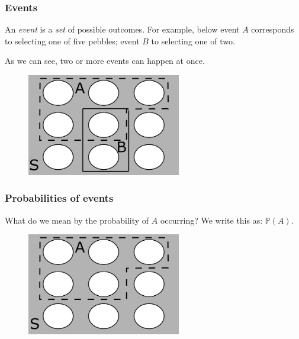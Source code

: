 \documentclass{beamer}
\begin{document}
	\begin{frame}
		\frametitle{Events}
		
		An \textit{event} is a \textit{set} of possible outcomes. For example, below event $A$ corresponds to selecting one of five pebbles; event $B$ to selecting one of two.
		
		As we can see, two or more events can happen at once.
		
		\begin{figure}[ht]
			\centerline{\includegraphics[width=0.6\textwidth]{./figures/pebble_world.png}}
		\end{figure}
		
	\end{frame}


	\begin{frame}
		\frametitle{Probabilities of events}
		
		What do we mean by the probability of $A$ occurring? We write this as: $\mathbb{P}(A)$.
		
		\begin{figure}[ht]
			\centerline{\includegraphics[width=0.6\textwidth]{./figures/pebble_world_proba.png}}
		\end{figure}
		
	\end{frame}
\end{document}

